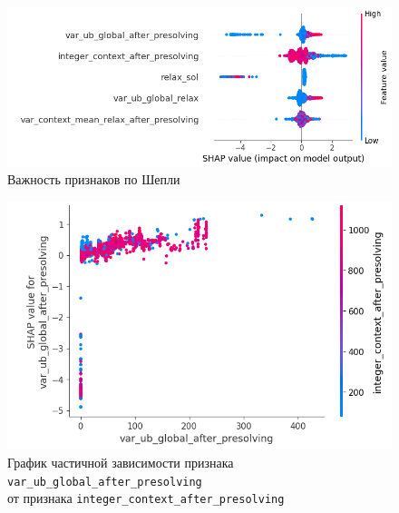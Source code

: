 \documentclass[%
	11pt,
	a4paper,
	utf8,
		]{article}
\begin{document}
\begin{figure}[h]
	\centering
	\includegraphics[scale=1.0]{figures/shap_imprt.png}
	\caption{ Важность признаков по Шепли }\label{fig:shap_imprt}
\end{figure}

\begin{figure}[h]
	\centering
	\includegraphics[scale=0.90]{figures/part_depend_var_ub_global.png}
	\caption{ График частичной зависимости признака \texttt{var\_ub\_global\_after\_presolving} \\от признака \texttt{integer\_context\_after\_presolving}  }\label{fig:part_depend_var_ub_global}
\end{figure}
\end{document}
